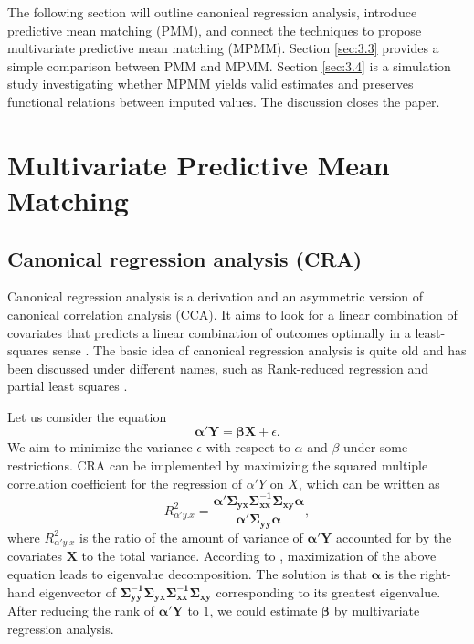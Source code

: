 	
	
	The following section will outline canonical regression analysis, introduce predictive mean matching (PMM), and connect the techniques to propose multivariate predictive mean matching (MPMM). Section \ref{sec:3.3} provides a simple comparison between PMM and MPMM. Section \ref{sec:3.4} is a simulation study investigating whether MPMM yields valid estimates and preserves functional relations between imputed values. The discussion closes the paper.
	
	
	
	
	
	\section{Multivariate Predictive Mean Matching}
	\label{sec:3.2}
	\subsection{Canonical regression analysis (CRA)}
	Canonical regression analysis is a derivation and an asymmetric version of canonical correlation analysis (CCA). It aims to look for a linear combination of covariates that predicts a linear combination of outcomes optimally in a least-squares sense \citep{Israels1987}. The basic idea of canonical regression analysis is quite old and has been discussed under different names, such as Rank-reduced regression \citep{izenman1975reduced} and partial least squares \citep{sun2009equivalence}.  
	
	Let us consider the equation
	\begin{equation}
		\boldsymbol{\alpha'Y} = \boldsymbol{\beta X} + \epsilon.
	\end{equation}
	We aim to minimize the variance $\epsilon$ with respect to $\alpha$ and $\beta$ under some restrictions. CRA can be implemented by maximizing the squared multiple correlation coefficient for the regression of $\alpha'Y$ on $X$, which can be written as
	\begin{equation}
		R^2_{\alpha'y.x}=\frac{\boldsymbol{\alpha'\Sigma_{yx}\Sigma^{-1}_{xx}\Sigma_{xy}\alpha}}{\boldsymbol{\alpha'\Sigma_{yy}\alpha}},
	\end{equation}
	where $R^2_{\alpha'y.x}$ is the ratio of the amount of variance of $\boldsymbol{\alpha'Y}$ accounted for by the covariates $\boldsymbol{X}$ to the total variance. According to \citet{McDonald1968}, maximization of the above equation leads to eigenvalue decomposition. The solution is that $\boldsymbol{\alpha}$ is the right-hand eigenvector of $\boldsymbol{\Sigma^{-1}_{yy}\Sigma_{yx}\Sigma^{-1}_{xx}\Sigma_{xy}}$ corresponding to its greatest eigenvalue. After reducing the rank of $\boldsymbol{\alpha'Y}$ to $1$, we could estimate $\boldsymbol{\beta}$ by multivariate regression analysis. 
	
